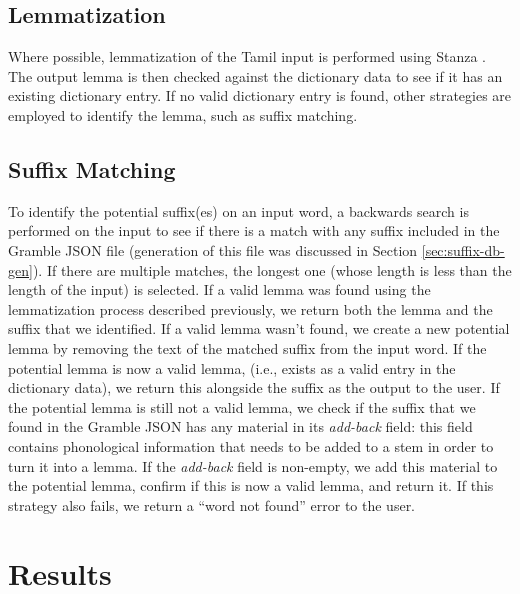 \documentclass[11pt]{article}
\begin{document}
\subsection{Lemmatization}
Where possible, lemmatization of the Tamil input is performed using 
Stanza \citep{qi2020stanza}. The output lemma is then checked 
against the dictionary data to see if it has an existing dictionary entry. 
If no valid dictionary entry is found, other strategies are 
employed to identify the lemma, such as suffix matching.

\subsection{Suffix Matching} \label{sec:suffix-matching}
To identify the potential suffix(es) on an input word, a backwards 
search is performed on the input to see if there is a match with 
any suffix included in the Gramble JSON file (generation of this file was discussed in Section \ref{sec:suffix-db-gen}). If there are multiple matches, 
the longest one (whose length is less than the length of the input) is 
selected. If a valid lemma was found using the lemmatization process 
described previously, we return both the lemma and the suffix that 
we identified. If a valid lemma wasn’t found, we create a new potential 
lemma by removing the text of the matched suffix from the input word. 
If the potential lemma is now a valid lemma, (i.e., exists as a valid 
entry in the dictionary data), we return this alongside the suffix 
as the output to the user. If the potential lemma is still not a valid 
lemma, we check if the suffix that we found in the Gramble JSON has any 
material in its \textit{add-back} field: this field contains phonological 
information that needs to be added to a stem in order to turn it into a lemma. 
If the \textit{add-back} field is non-empty, we add this material 
to the potential lemma, confirm if this is now a valid lemma, 
and return it. If this strategy also fails, we return a “word not found” error to the user.

\section{Results}
\end{document}
